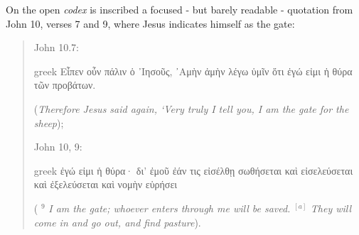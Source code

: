 \documentclass[amsthm,ebook]{saparticle}
\begin{document}
On the open \emph{codex} is inscribed a focused - but barely readable - quotation from John 10, verses 7 and 9, where Jesus
indicates himself as the gate: 




\begin{quotation}
John 10.7: \begin{otherlanguage*}{greek}
Εἶπεν οὖν πάλιν ὁ ᾿Ιησοῦς, ᾿Αμὴν ἀμὴν λέγω ὑμῖν ὅτι ἐγώ εἰμι ἡ θύρα τῶν προβάτων.
\end{otherlanguage*} (\emph{Therefore Jesus said again, ‘Very truly I tell you, I am the gate for the sheep}); 

John 10, 9: \begin{otherlanguage*}{greek}
ἐγώ εἰμι ἡ θύρα· δι' ἐμοῦ ἐάν τις εἰσέλθῃ σωθήσεται καὶ εἰσελεύσεται καὶ ἐξελεύσεται καὶ νομὴν εὑρήσει
\end{otherlanguage*}  ( $^\textit{9}$ \emph{I am the gate;
whoever enters through me will be saved.} $^{[a]}$ \emph{They will come in and go out, and find pasture}).

\end{quotation}
\end{document}
